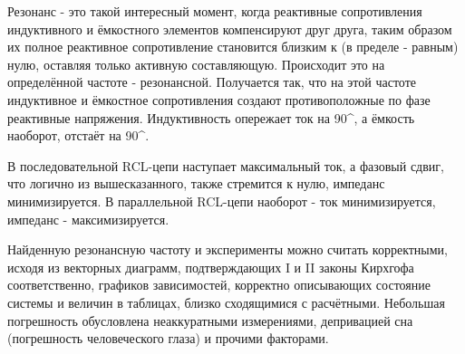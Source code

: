 Резонанс - это такой интересный момент, когда реактивные сопротивления индуктивного и ёмкостного элементов компенсируют друг друга, таким образом их полное реактивное сопротивление становится близким к (в пределе - равным) нулю, оставляя только активную составляющую. Происходит это на определённой частоте - резонансной. Получается так, что на этой частоте индуктивное и ёмкостное сопротивления создают противоположные по фазе реактивные напряжения. Индуктивность опережает ток на 90^\circ, а ёмкость наоборот, отстаёт на 90^\circ.

В последовательной RCL-цепи наступает максимальный ток, а фазовый сдвиг, что логично из вышесказанного, также стремится к нулю, импеданс минимизируется. В параллельной RCL-цепи наоборот - ток минимизируется, импеданс - максимизируется.

Найденную резонансную частоту и эксперименты можно считать корректными, исходя из векторных диаграмм, подтверждающих I и II законы Кирхгофа соответственно, графиков зависимостей, корректно описывающих состояние системы и величин в таблицах, близко сходящимися с расчётными. Небольшая погрешность обусловлена неаккуратными измерениями, депривацией сна (погрешность человеческого глаза) и прочими факторами.

